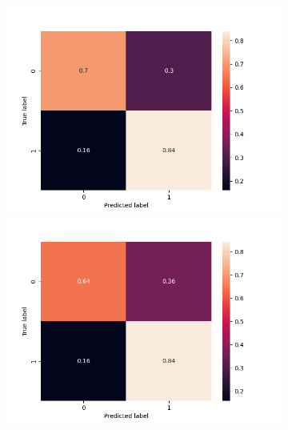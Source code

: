 \begin{figure}
\begin{subfigure}[b]{\textwidth}
    \endminipage\hfill
      \includegraphics[width=\linewidth]{figures/results/word_embeddings/nn/calibrate/calibrate_set_2_confusion_matrix_percent.png}
    \endminipage\hfill
      \includegraphics[width=\linewidth]{figures/results/word_embeddings/nn/calibrate/calibrate+_set_3_confusion_matrix_percent.png}
    \endminipage
    
    \medskip
    

\end{subfigure}
\end{figure}
